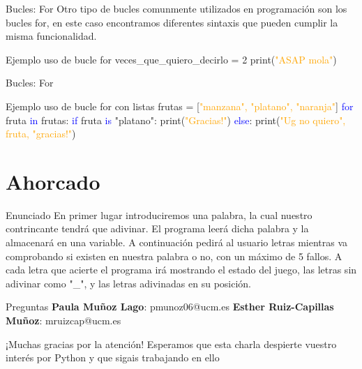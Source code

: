 \documentclass{beamer}
\begin{document}
\begin{frame}{Bucles: For}
Otro tipo de bucles comunmente utilizados en programación son los bucles for, en este caso encontramos diferentes sintaxis que pueden cumplir la misma funcionalidad.
\begin{Programexample}{Ejemplo uso de bucle for}
veces\_que\_quiero\_decirlo = 2 \newline
{} \newline
\hspace*{1cm} print(\textcolor{orange}{"ASAP mola"})
\end{Programexample}
\end{frame}
                    
\begin{frame}{Bucles: For}
\begin{Programexample}{Ejemplo uso de bucle for con listas}
frutas = [\textcolor{orange}{"manzana", "platano", "naranja"}] \newline
\textcolor{blue}{for} fruta \textcolor{blue}{in} frutas: \newline
\hspace*{1cm}\textcolor{blue}{if} fruta \textcolor{blue}{is} "platano": \newline
\hspace*{2cm} print(\textcolor{orange}{"Gracias!"}) \newline
\hspace*{1cm}\textcolor{blue}{else}: \newline
\hspace*{2cm} print(\textcolor{orange}{"Ug no quiero", fruta, "gracias!"})
\end{Programexample}
\end{frame}

\section{Ahorcado}

\begin{frame}{Enunciado}
En primer lugar introduciremos una palabra, la cual nuestro contrincante tendrá que adivinar. El programa leerá dicha palabra y la almacenará en una variable.
A continuación pedirá al usuario letras mientras va comprobando si existen en nuestra palabra o no, con un máximo de 5 fallos.
A cada letra que acierte el programa irá mostrando el estado del juego, las letras sin adivinar como "\_", y las letras adivinadas en su posición.
\end{frame}

\begin{frame}{Preguntas}
\textbf{Paula Muñoz Lago}: pmunoz06@ucm.es \newline
\textbf{Esther Ruiz-Capillas Muñoz}: mruizcap@ucm.es
\end{frame}

\begin{frame}[focus]
¡Muchas gracias por la atención! \newline
Esperamos que esta charla despierte vuestro interés por Python y que sigais trabajando en ello
\end{frame}
\end{document}
